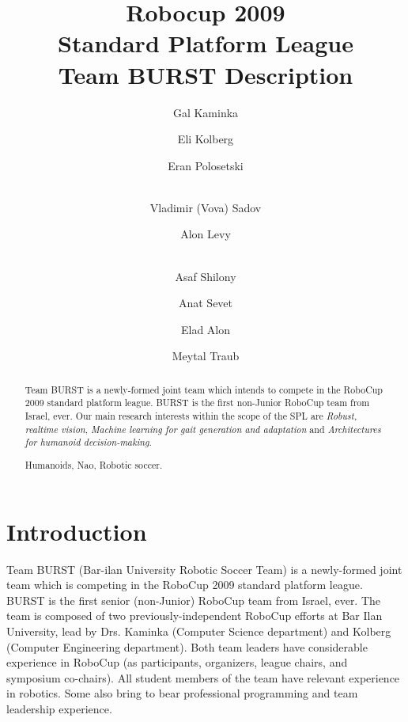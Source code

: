 \documentclass[runningheads,a4paper]{llncs}
\newcommand{\keywords}[1]{\par\addvspace\baselineskip
\noindent\keywordname\enspace\ignorespaces#1}
\begin{document}
\mainmatter  %

\title{Robocup 2009\\Standard Platform League\\Team BURST Description}


\author{Gal Kaminka
\and Eli Kolberg\and Eran Polosetski\and\\ Vladimir (Vova) Sadov\and
Alon Levy\and\\ Asaf Shilony\and Anat Sevet\and Elad Alon\and Meytal Traub}
%


%
%

\maketitle


\begin{abstract}
Team BURST is a newly-formed joint team which intends to compete in the RoboCup
2009 standard platform league. BURST is the first non-Junior RoboCup team from Israel, ever. Our main research interests within the scope of the SPL are \emph{Robust, realtime vision}, \emph{Machine learning for gait generation and adaptation} and \emph{Architectures for humanoid decision-making}.


\keywords{Humanoids, Nao, Robotic soccer.}
\end{abstract}


\section{Introduction}
Team BURST (Bar-ilan University Robotic Soccer Team) is a newly-formed joint team which is competing in the RoboCup 2009 standard platform league. BURST is the first senior (non-Junior) RoboCup team from Israel, ever. The team is composed of two previously-independent RoboCup efforts at Bar Ilan University, lead by Drs. Kaminka (Computer Science department) and Kolberg (Computer Engineering department). Both team leaders have considerable experience in RoboCup (as participants, organizers, league chairs, and symposium co-chairs). All student members of the team have relevant experience in robotics. Some also bring to bear professional programming and team leadership experience.
\end{document}
